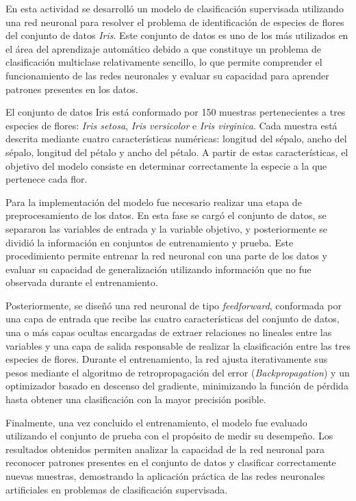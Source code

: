 \documentclass[12pt]{article}
\begin{document}
En esta actividad se desarrolló un modelo de clasificación supervisada utilizando una red neuronal para resolver el problema de identificación de especies de flores del conjunto de datos \textit{Iris}. Este conjunto de datos es uno de los más utilizados en el área del aprendizaje automático debido a que constituye un problema de clasificación multiclase relativamente sencillo, lo que permite comprender el funcionamiento de las redes neuronales y evaluar su capacidad para aprender patrones presentes en los datos.

El conjunto de datos Iris está conformado por 150 muestras pertenecientes a tres especies de flores: \textit{Iris setosa}, \textit{Iris versicolor} e \textit{Iris virginica}. Cada muestra está descrita mediante cuatro características numéricas: longitud del sépalo, ancho del sépalo, longitud del pétalo y ancho del pétalo. A partir de estas características, el objetivo del modelo consiste en determinar correctamente la especie a la que pertenece cada flor.

Para la implementación del modelo fue necesario realizar una etapa de preprocesamiento de los datos. En esta fase se cargó el conjunto de datos, se separaron las variables de entrada y la variable objetivo, y posteriormente se dividió la información en conjuntos de entrenamiento y prueba. Este procedimiento permite entrenar la red neuronal con una parte de los datos y evaluar su capacidad de generalización utilizando información que no fue observada durante el entrenamiento.

Posteriormente, se diseñó una red neuronal de tipo \textit{feedforward}, conformada por una capa de entrada que recibe las cuatro características del conjunto de datos, una o más capas ocultas encargadas de extraer relaciones no lineales entre las variables y una capa de salida responsable de realizar la clasificación entre las tres especies de flores. Durante el entrenamiento, la red ajusta iterativamente sus pesos mediante el algoritmo de retropropagación del error (\textit{Backpropagation}) y un optimizador basado en descenso del gradiente, minimizando la función de pérdida hasta obtener una clasificación con la mayor precisión posible.

Finalmente, una vez concluido el entrenamiento, el modelo fue evaluado utilizando el conjunto de prueba con el propósito de medir su desempeño. Los resultados obtenidos permiten analizar la capacidad de la red neuronal para reconocer patrones presentes en el conjunto de datos y clasificar correctamente nuevas muestras, demostrando la aplicación práctica de las redes neuronales artificiales en problemas de clasificación supervisada.
\end{document}
